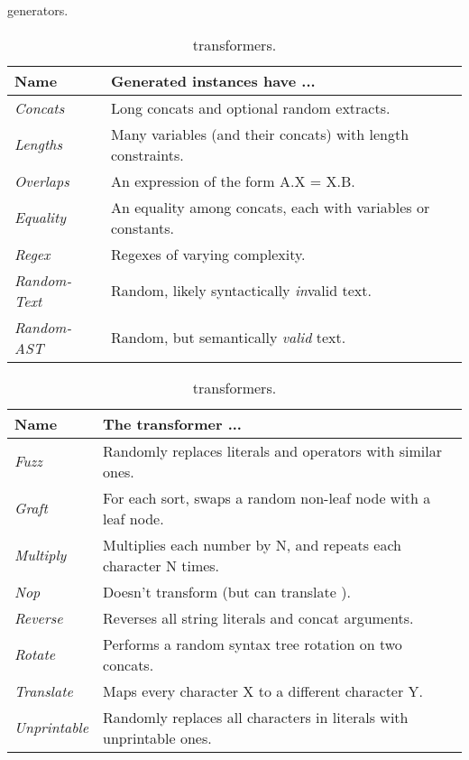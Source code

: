 \begin{table}[t]
    \centering
    \caption{\generator{} generators.}
    \label{tbl:generators}
    \begin{tabular}{|l|l|}
        \hline
        \textbf{Name}        & \textbf{Generated instances have ...} \\ \hline
        \textit{Concats}     & Long concats and optional random extracts. \\ \hline
        \textit{Lengths}     & Many variables (and their concats) with length constraints. \\ \hline
        \textit{Overlaps}    & An expression of the form A.X = X.B. \\ \hline
        \textit{Equality}    & An equality among concats, each with variables or constants. \\ \hline
        \textit{Regex}       & Regexes of varying complexity. \\ \hline
        \textit{Random-Text} & Random, likely syntactically \textit{in}valid text. \\ \hline
        \textit{Random-AST}  & Random, but semantically \textit{valid} text. \\ \hline
    \end{tabular}
    \caption{\transformer{} transformers.}
    \label{tbl:transformers}
    \begin{tabular}{|l|l|}
        \hline
        \textbf{Name}        & \textbf{The transformer ...} \\ \hline
        \textit{Fuzz}        & Randomly replaces literals and operators with similar ones. \\ \hline
        \textit{Graft}       & For each sort, swaps a random non-leaf node with a leaf node. \\ \hline
        \textit{Multiply}    & Multiplies each number by N, and repeats each character N times. \\ \hline
        \textit{Nop}         & Doesn't transform (but can translate \smtfull{}). \\ \hline
        \textit{Reverse}     & Reverses all string literals and concat arguments. \\ \hline
        \textit{Rotate}      & Performs a random syntax tree rotation on two concats. \\ \hline
        \textit{Translate}   & Maps every character X to a different character Y. \\ \hline
        \textit{Unprintable} & Randomly replaces all characters in literals with unprintable ones. \\ \hline
    \end{tabular}
\end{table}

